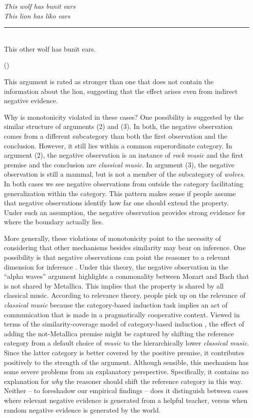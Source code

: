 \documentclass[authoryear,11pt]{elsarticle}
\newcounter{quotecount}
\newcommand{\MyQuote}[1]{\vspace{.5cm}\addtocounter{quotecount}{1}%
     \parbox{13cm}{\em #1}\hspace*{1cm}(\arabic{quotecount})\\[0cm]\vspace{.5cm}}
\begin{document}
\MyQuote{This wolf has bunit ears \\
This lion has liko ears\\[-5pt]
\rule[0pt]{250pt}{1pt} \\[-2pt]
This other wolf has bunit ears.
}

\noindent
This argument is rated as stronger than one that does not contain the information about the lion, suggesting that the effect arises even from indirect negative evidence.

Why is monotonicity violated in these cases? One possibility is suggested by the similar structure of arguments (2) and (3). In both, the negative observation comes from a different subcategory than both the first observation and the conclusion. However, it still lies within a common superordinate category. In argument (2), the negative observation is an instance of {\it rock music} and the first premise and the conclusion are {\it classical music}. In argument (3), the negative observation is still a mammal, but is not a member of the subcategory of {\it wolves}. In both cases we see negative observations from outside the category facilitating generalization within the category. This pattern makes sense if people assume that negative observations identify how far one should extend the property. Under such an assumption, the negative observation provides strong evidence for where the boundary actually lies.

More generally, these violations of monotonicity point to the necessity of considering that other mechanisms  besides similarity may bear on inference. One possibility is that negative observations can point the reasoner to a relevant dimension for inference \citep{Heussenetal2011, Medinetal2003}. Under this theory, the negative observation in the ``alpha waves'' argument highlights a commonality between Mozart and Bach that is not shared by Metallica. This implies that the property is shared by all classical music. According to relevance theory, people pick up on the relevance of {\it classical music} because the category-based induction task implies an act of communication that is made in a pragmatically cooperative context. Viewed in terms of the similarity-coverage model of category-based induction \citep{Oshersonetal1990}, the effect of adding the not-Metallica premise might be captured by shifting the reference category from a default choice of {\it music} to the hierarchically lower {\it classical music}. Since the latter category is better covered by the positive premise, it contributes positively to the strength of the argument. Although sensible, this mechanism has some severe problems from an explanatory perspective. Specifically, it contains no explanation for {\it why} the reasoner should shift the reference category in this way. Neither -- to foreshadow our empirical findings -- does it distinguish between cases where relevant negative evidence is generated from a helpful teacher, versus when random negative evidence is generated by the world.
\end{document}
